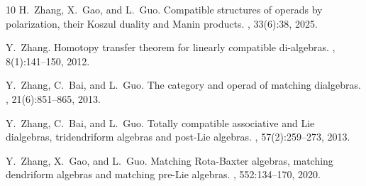 \documentclass{jonasart}
\begin{document}
{\begin{thebibliography}{10}
            H.~Zhang, X.~Gao, and L.~Guo.
            \newblock Compatible structures of operads by polarization, their {K}oszul duality and {M}anin products.
            , 33(6):38, 2025.
            
            Y.~Zhang.
            \newblock Homotopy {t}ransfer {t}heorem for linearly compatible di-algebras.
            , 8(1):141–150, 2012.
            
            Y.~Zhang, C.~Bai, and L.~Guo.
            \newblock The category and operad of matching dialgebras.
            , 21(6):851--865, 2013.
            
            Y.~Zhang, C.~{B}ai, and L.~{G}uo.
            \newblock Totally compatible associative and {L}ie dialgebras, tridendriform algebras and {p}ost-Lie algebras.
            , 57(2):259–273, 2013.
            
            Y.~Zhang, X.~{G}ao, and L.~{G}uo.
            \newblock Matching {R}ota-Baxter algebras, matching dendriform algebras and matching pre-Lie algebras.
            , 552:134–170, 2020.
        \end{thebibliography}
    }
\end{document}
